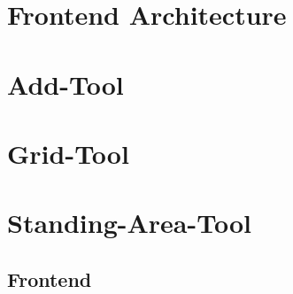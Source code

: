 \section{Frontend Architecture}


\section{Add-Tool}


\section{Grid-Tool}
\label{sec:grid-tool}


\section{Standing-Area-Tool}

\subsection{Frontend}

